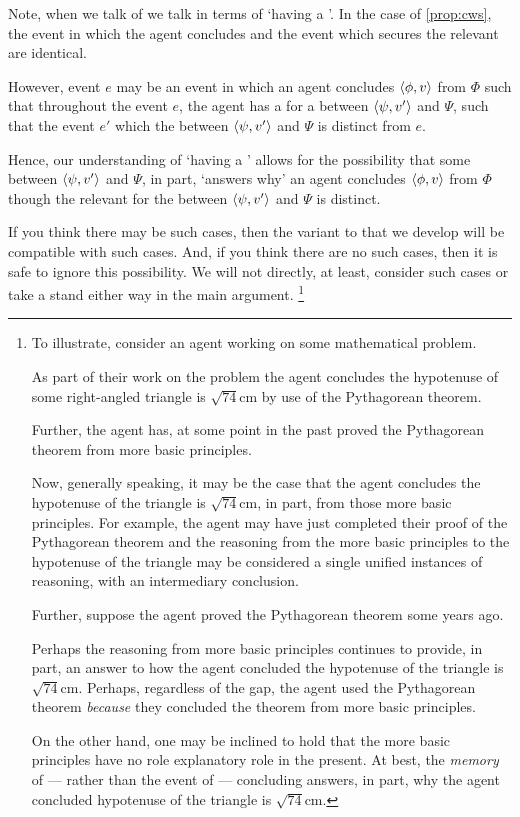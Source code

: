 \begin{note}
  Note, when we talk of  we talk in terms of `having a '.
  In the case of \autoref{prop:cws}, the event in which the agent concludes and the event which secures the relevant \wit{} are identical.

  However, event \(e\) may be an event in which an agent concludes \(\langle \phi, v \rangle\) from \(\Phi\) such that throughout the event \(e\), the agent has a \wit{} for a \ros{} between \(\langle \psi, v' \rangle\) and \(\Psi\), such that the event \(e'\) which  the \ros{} between \(\langle \psi, v' \rangle\) and \(\Psi\) is distinct from \(e\).

  Hence, our understanding of `having a ' allows for the possibility that some \ros{} between \(\langle \psi, v' \rangle\) and \(\Psi\), in part, `answers why' an agent concludes \(\langle \phi, v \rangle\) from \(\Phi\) though the relevant  for the \ros{} between \(\langle \psi, v' \rangle\) and \(\Psi\) is distinct.

  If you think there may be such cases, then the variant to \issueInclusion{} that we develop will be compatible with such cases.
  And, if you think there are no such cases, then it is safe to ignore this possibility.
  We will not directly, at least, consider such cases or take a stand either way in the main argument.%
  \footnote{
    To illustrate, consider an agent working on some mathematical problem.

    As part of their work on the problem the agent concludes the hypotenuse of some right-angled triangle is \(\sqrt{74}\text{cm}\) by use of the Pythagorean theorem.

    Further, the agent has, at some point in the past proved the Pythagorean theorem from more basic principles.

    Now, generally speaking, it may be the case that the agent concludes the hypotenuse of the triangle is \(\sqrt{74}\text{cm}\), in part, from those more basic principles.
    For example, the agent may have just completed their proof of the Pythagorean theorem and the reasoning from the more basic principles to the hypotenuse of the triangle may be considered a single unified instances of reasoning, with an intermediary conclusion.

    Further, suppose the agent proved the Pythagorean theorem some years ago.

    Perhaps the \agents{} reasoning from more basic principles continues to provide, in part, an answer to how the agent concluded the hypotenuse of the triangle is \(\sqrt{74}\text{cm}\).
    Perhaps, regardless of the gap, the agent used the Pythagorean theorem \emph{because} they concluded the theorem from more basic principles.

    On the other hand, one may be inclined to hold that the more basic principles have no role explanatory role in the present.
    At best, the \agents{} \emph{memory} of --- rather than the event of --- concluding answers, in part, why the agent concluded hypotenuse of the triangle is \(\sqrt{74}\text{cm}\).
  }
\end{note}

